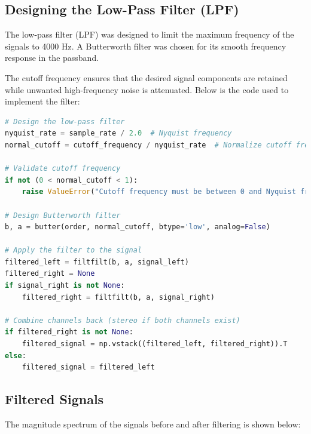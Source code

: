 \documentclass[12pt,a4paper]{article}
\begin{document}
\subsection{Designing the Low-Pass Filter (LPF)}
The low-pass filter (LPF) was designed to limit the maximum frequency of the signals to 4000 Hz. A Butterworth filter was chosen for its smooth frequency response in the passband. 

The cutoff frequency ensures that the desired signal components are retained while unwanted high-frequency noise is attenuated. Below is the code used to implement the filter:
\begin{lstlisting}[language=Python, caption=Butterworth LPF Code]
# Design the low-pass filter
nyquist_rate = sample_rate / 2.0  # Nyquist frequency
normal_cutoff = cutoff_frequency / nyquist_rate  # Normalize cutoff frequency

# Validate cutoff frequency
if not (0 < normal_cutoff < 1):
    raise ValueError("Cutoff frequency must be between 0 and Nyquist frequency.")

# Design Butterworth filter
b, a = butter(order, normal_cutoff, btype='low', analog=False)

# Apply the filter to the signal
filtered_left = filtfilt(b, a, signal_left)
filtered_right = None
if signal_right is not None:
    filtered_right = filtfilt(b, a, signal_right)

# Combine channels back (stereo if both channels exist)
if filtered_right is not None:
    filtered_signal = np.vstack((filtered_left, filtered_right)).T
else:
    filtered_signal = filtered_left
\end{lstlisting}

\subsection{Filtered Signals}
The magnitude spectrum of the signals before and after filtering is shown below:
\end{document}

